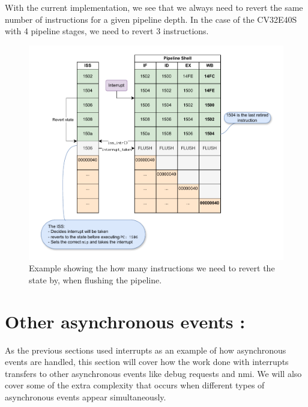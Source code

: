 With the current implementation, we see that we always need to revert the same number of instructions for a given pipeline depth. In the case of the CV32E40S with 4 pipeline stages, we need to revert 3 instructions.

\begin{figure}
    \centering
    \includegraphics[width=0.85\linewidth]{figures/revert_example.pdf}
    \caption{Example showing the how many instructions we need to revert the state by, when flushing the pipeline.}
    \label{fig:revert_example}
\end{figure}


%
%
%
%






\section{Other asynchronous events : }

As the previous sections used interrupts as an example of how asynchronous events are handled, this section will cover how the work done with interrupts transfers to other asynchronous events like debug requests and \acrfull{nmi}.
We will also cover some of the extra complexity that occurs when different types of asynchronous events appear simultaneously.

